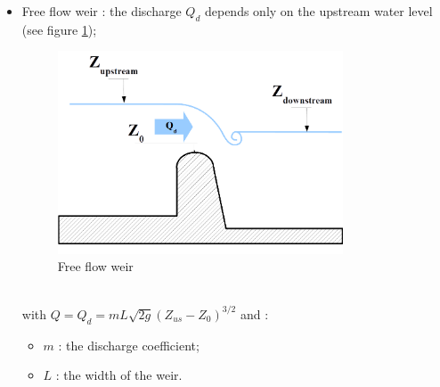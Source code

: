 \begin{itemize}
 \item \textsf{Free flow weir} : the discharge  $Q_d$ depends only on the upstream water level (see figure \ref{fig:Sd});
   \begin{figure}
     \begin{center}
        \includegraphics[width=0.8\textwidth]{Figures/Schema_Seuil_Denoye.png}
        \caption{Free flow weir}
        \label{fig:Sd}
     \end{center}
   \end{figure}
   \\
   with $Q = Q_d = m L \sqrt{2g} (Z_{us}-Z_0)^{3/2}$ and :
   \begin{itemize}
     \item $m$ : the discharge coefficient;
     \item $L$ : the width of the weir.
   \end{itemize}


\end{itemize}
